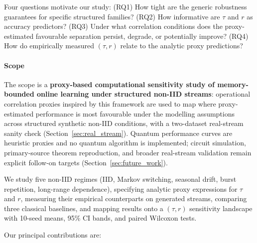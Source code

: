 \documentclass[preprint,12pt,authoryear]{elsarticle}
\begin{document}
Four questions motivate our study: (RQ1) How tight are the generic robustness guarantees for specific structured families? (RQ2) How informative are $\tau$ and $r$ as accuracy predictors? (RQ3) Under what correlation conditions does the proxy-estimated favourable separation persist, degrade, or potentially improve? (RQ4) How do empirically measured $(\tau, r)$ relate to the analytic proxy predictions?

\paragraph{Scope} The scope is a \textbf{proxy-based computational sensitivity study of memory-bounded online learning under structured non\nobreakdash-IID streams}: operational correlation proxies inspired by this framework are used to map where proxy-estimated performance is most favourable under the modelling assumptions across structured synthetic non\nobreakdash-IID conditions, with a two\nobreakdash-dataset real-stream sanity check (Section~\ref{sec:real_stream}). Quantum performance curves are heuristic proxies and no quantum algorithm is implemented; circuit simulation, primary-source theorem reproduction, and broader real-stream validation remain explicit follow-on targets (Section~\ref{sec:future_work}).

We study five non\nobreakdash-IID regimes (IID, Markov switching, seasonal drift, burst repetition, long-range dependence), specifying analytic proxy expressions for $\tau$ and $r$, measuring their empirical counterparts on generated streams, comparing three classical baselines, and mapping results onto a $(\tau, r)$ sensitivity landscape with 10-seed means, 95\% CI bands, and paired Wilcoxon tests.

Our principal contributions are:
\end{document}
